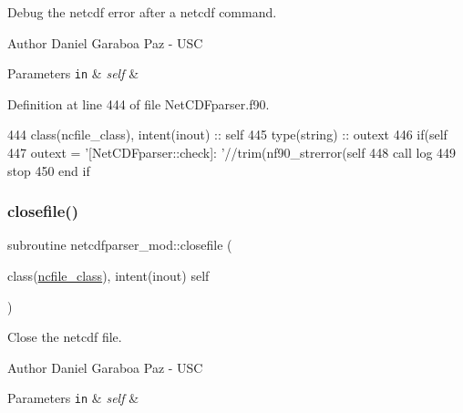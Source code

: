 Debug the netcdf error after a netcdf command. 

\begin{DoxyAuthor}{Author}
Daniel Garaboa Paz -\/ U\+SC 
\end{DoxyAuthor}

\begin{DoxyParams}[1]{Parameters}
\mbox{\tt in}  & {\em self} & \\
\hline
\end{DoxyParams}


Definition at line 444 of file Net\+C\+D\+Fparser.\+f90.


\begin{DoxyCode}
444     \textcolor{keywordtype}{class}(ncfile\_class), \textcolor{keywordtype}{intent(inout)} :: self
445     \textcolor{keywordtype}{type}(string) :: outext
446     \textcolor{keywordflow}{if}(self%
447         outext = \textcolor{stringliteral}{'[NetCDFparser::check]: '}//trim(nf90\_strerror(self%
448         \textcolor{keyword}{call }log%
449         stop
450 \textcolor{keywordflow}{    end if}
\end{DoxyCode}
\mbox{\label{namespacenetcdfparser__mod_a518627511cac4bf3dbc338bf3bfd5e24}} 
\subsubsection{\texorpdfstring{closefile()}{closefile()}}
{\footnotesize\ttfamily subroutine netcdfparser\+\_\+mod\+::closefile (\begin{DoxyParamCaption}\item[{class(\mbox{\hyperlink{structnetcdfparser__mod_1_1ncfile__class}{ncfile\+\_\+class}}), intent(inout)}]{self }\end{DoxyParamCaption})\hspace{0.3cm}{\ttfamily [private]}}



Close the netcdf file. 

\begin{DoxyAuthor}{Author}
Daniel Garaboa Paz -\/ U\+SC 
\end{DoxyAuthor}

\begin{DoxyParams}[1]{Parameters}
\mbox{\tt in}  & {\em self} & \\
\hline
\end{DoxyParams}


